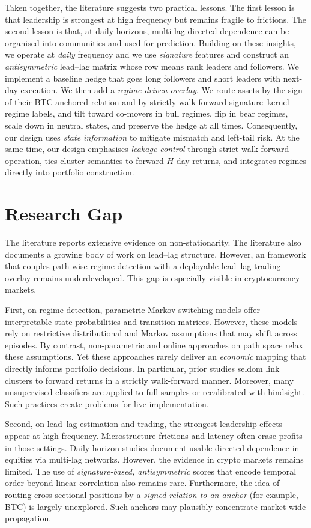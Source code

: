 Taken together, the literature suggests two practical lessons. The first lesson is that leadership is strongest at high frequency but remains fragile to frictions. The second lesson is that, at daily horizons, multi-lag directed dependence can be organised into communities and used for prediction. Building on these insights, we operate at \emph{daily} frequency and we use \emph{signature} features and construct an \emph{antisymmetric} lead--lag matrix whose row means rank leaders and followers. We implement a baseline hedge that goes long followers and short leaders with next-day execution. We then add a \emph{regime-driven overlay}. We route assets by the sign of their BTC-anchored relation and by strictly walk-forward signature--kernel regime labels, and tilt toward co-movers in bull regimes, flip in bear regimes, scale down in neutral states, and preserve the hedge at all times. Consequently, our design uses \emph{state information} to mitigate mismatch and left-tail risk. At the same time, our design emphasises \emph{leakage control} through strict walk-forward operation, ties cluster semantics to forward $H$-day returns, and integrates regimes directly into portfolio construction.


\section{Research Gap}\label{sec:lit:gap}

The literature reports extensive evidence on non-stationarity. The literature also documents a growing body of work on lead--lag structure. However, an framework that couples path-wise regime detection with a deployable lead--lag trading overlay remains underdeveloped. This gap is especially visible in cryptocurrency markets.

First, on regime detection, parametric Markov-switching models offer interpretable state probabilities and transition matrices. However, these models rely on restrictive distributional and Markov assumptions that may shift across episodes. By contrast, non-parametric and online approaches on path space relax these assumptions. Yet these approaches rarely deliver an \emph{economic} mapping that directly informs portfolio decisions. In particular, prior studies seldom link clusters to forward returns in a strictly walk-forward manner. Moreover, many unsupervised classifiers are applied to full samples or recalibrated with hindsight. Such practices create problems for live implementation.

Second, on lead--lag estimation and trading, the strongest leadership effects appear at high frequency. Microstructure frictions and latency often erase profits in those settings. Daily-horizon studies document usable directed dependence in equities via multi-lag networks. However, the evidence in crypto markets remains limited. The use of \emph{signature-based, antisymmetric} scores that encode temporal order beyond linear correlation also remains rare. Furthermore, the idea of routing cross-sectional positions by a \emph{signed relation to an anchor} (for example, BTC) is largely unexplored. Such anchors may plausibly concentrate market-wide propagation.

